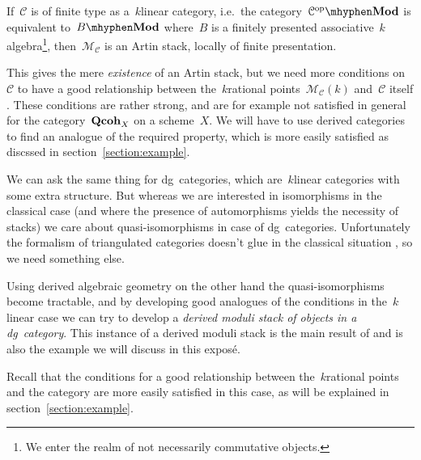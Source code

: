 \begin{refsection}
\begin{example}
  If~$\mathcal{C}$ is of finite type as a~$k$\dash linear category, i.e.\ the category~$\mathcal{C}^\opp\mhyphen\Mod$ is equivalent to~$B\mhyphen\Mod$ where~$B$ is a finitely presented associative~$k$\dash algebra\footnote{We enter the realm of not necessarily commutative objects.}, then~$\mathcal{M}_{\mathcal{C}}$ is an Artin stack, locally of finite presentation.

  This gives the mere \emph{existence} of an Artin stack, but we need more conditions on~$\mathcal{C}$ to have a good relationship between the~$k$\dash rational points~$\mathcal{M}_{\mathcal{C}}(k)$ and~$\mathcal{C}$ itself \cite[remark 1.2]{toen-vaquie-moduli-of-objects-in-dg-categories}. These conditions are rather strong, and are for example not satisfied in general for the category~$\mathbf{Qcoh}_X$ on a scheme~$X$. We will have to use derived categories to find an analogue of the required property, which is more easily satisfied as discssed in section~\ref{section:example}.
\end{example}

\begin{remark}
  We can ask the same thing for dg~categories, which are~$k$\dash linear categories with some extra structure. But whereas we are interested in isomorphisms in the classical case (and where the presence of automorphisms yields the necessity of stacks) we care about quasi-isomorphisms in case of dg~categories. Unfortunately the formalism of triangulated categories doesn't glue in the classical situation \cite[example 4 in section 2.2]{toen-lectures-on-dg-categories}, so we need something else.

  Using derived algebraic geometry on the other hand the quasi-isomorphisms become tractable, and by developing good analogues of the conditions in the~$k$\dash linear case we can try to develop a \emph{derived moduli stack of objects in a dg~category}. This instance of a derived moduli stack is the main result of \cite{toen-vaquie-moduli-of-objects-in-dg-categories} and is also the example we will discuss in this expos\'e.
  
  Recall that the conditions for a good relationship between the~$k$\dash rational points and the category are more easily satisfied in this case, as will be explained in section~\ref{section:example}.
\end{remark}


\end{refsection}
